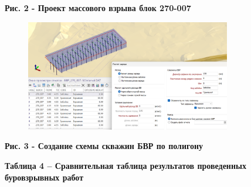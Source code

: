 {\bfseries Рис. 2 - Проект массового взрыва блок 270-007}

\begin{figure}[H]
	\centering
	\includegraphics[width=0.8\textwidth]{media/gor/image30}
	\caption*{}
\end{figure}


{\bfseries Рис. 3 - Создание схемы скважин БВР по полигону}

{\bfseries Таблица 4 -- Сравнительная таблица результатов проведенных
буровзрывных работ}

